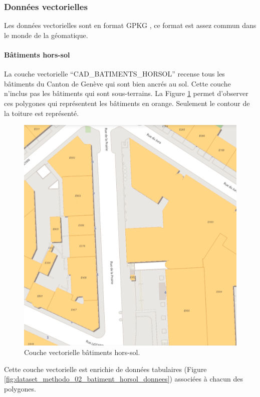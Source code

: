 \subsubsection{Données vectorielles}
Les données vectorielles sont en format GPKG \cite{noauthor_ogc_nodate}, ce format est assez commun dans le monde de la géomatique.
\paragraph{Bâtiments hors-sol}
La couche vectorielle ``CAD\_BATIMENTS\_HORSOL'' recense tous les bâtiments du Canton de Genève qui sont bien ancrés au sol. Cette couche n'inclus pas les bâtiments qui sont sous-terrains. La Figure \ref{fig:dataset_methodo_01_batiment_horsol} permet d'observer ces polygones qui représentent les bâtiments en orange. Seulement le contour de la toiture est représenté.
\begin{figure}[H]
    \centering
    \includegraphics[width=1\linewidth]{02-main//figures/dataset_methodo_01_batiment_horsol.png}
    \caption{Couche vectorielle bâtiments hors-sol.}
    \label{fig:dataset_methodo_01_batiment_horsol}
\end{figure}
Cette couche vectorielle est enrichie de données tabulaires (Figure \ref{fig:dataset_methodo_02_batiment_horsol_donnees}) associées à chacun des polygones.
